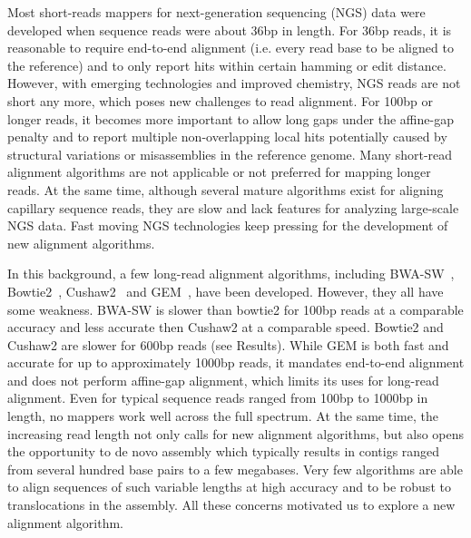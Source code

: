 \documentclass{bioinfo}
\begin{document}
Most short-reads mappers for next-generation sequencing (NGS) data were
developed when sequence reads were about 36bp in length. For 36bp reads, it is
reasonable to require end-to-end alignment (i.e. every read base to be aligned
to the reference) and to only report hits within certain hamming or edit
distance.  However, with emerging technologies and improved chemistry, NGS
reads are not short any more, which poses new challenges to read alignment. For
100bp or longer reads, it becomes more important to allow long gaps under the affine-gap
penalty and to report multiple non-overlapping local hits potentially caused by
structural variations or misassemblies in the reference genome. Many short-read
alignment algorithms are not applicable or not preferred for mapping longer
reads. At the same time, although several mature algorithms exist for aligning
capillary sequence reads, they are slow and lack features for analyzing
large-scale NGS data. Fast moving NGS technologies keep pressing for the
development of new alignment algorithms.

In this background, a few long-read alignment algorithms, including
BWA-SW~\citep{Li:2010fk}, Bowtie2~\citep{Langmead:2012fk},
Cushaw2~\citep{Liu:2012uq} and GEM~\citep{Marco-Sola:2012kx}, have been
developed. However, they all have some weakness. BWA-SW is slower than bowtie2
for 100bp reads at a comparable accuracy and less accurate then Cushaw2 at a
comparable speed. Bowtie2 and Cushaw2 are slower for 600bp reads (see Results).
While GEM is both fast and accurate for up to approximately 1000bp reads, it
mandates end-to-end alignment and does not perform affine-gap alignment, which
limits its uses for long-read alignment. Even for typical sequence reads ranged
from 100bp to 1000bp in length, no mappers work well across the full spectrum.
At the same time, the increasing read length not only calls for new alignment
algorithms, but also opens the opportunity to de novo assembly which typically
results in contigs ranged from several hundred base pairs to a few megabases.
Very few algorithms are able to align sequences of such variable lengths
at high accuracy and to be robust to translocations in the assembly. All these
concerns motivated us to explore a new alignment algorithm.

\vspace{-1em}
\end{document}

